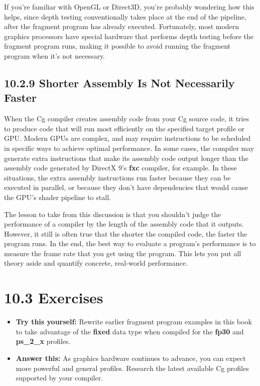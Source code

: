 \documentclass[../main.tex]{subfiles}
\begin{document}
If you're familiar with OpenGL or Direct3D, you're probably wondering how this helps, since depth testing conventionally takes place at the end of the pipeline, after the fragment program has already executed. Fortunately, most modern graphics processors have special hardware that performs depth testing before the fragment program runs, making it possible to avoid running the fragment program when it's not necessary.

\subsection{10.2.9 Shorter Assembly Is Not Necessarily Faster}

When the Cg compiler creates assembly code from your Cg source code, it tries to produce code that will run most efficiently on the specified target profile or GPU. Modern GPUs are complex, and may require instructions to be scheduled in specific ways to achieve optimal performance. In some cases, the compiler may generate extra instructions that make its assembly code output longer than the assembly code generated by DirectX 9's \textbf{fxc} compiler, for example. In these situations, the extra assembly instructions run faster because they can be executed in parallel, or because they don't have dependencies that would cause the GPU's shader pipeline to stall.

The lesson to take from this discussion is that you shouldn't judge the performance of a compiler by the length of the assembly code that it outputs. However, it still is often true that the shorter the compiled code, the faster the program runs. In the end, the best way to evaluate a program's performance is to measure the frame rate that you get using the program. This lets you put all theory aside and quantify concrete, real-world performance.

\section{10.3 Exercises}
\begin{itemize}
\item \textbf{Try this yourself:} Rewrite earlier fragment program examples in this book to take advantage of the \textbf{fixed} data type when compiled for the \textbf{fp30} and \textbf{ps_2_x} profiles.
\item \textbf{Answer this:} As graphics hardware continues to advance, you can expect more powerful and general profiles. Research the latest available Cg profiles supported by your compiler.
\end{itemize}
\end{document}
